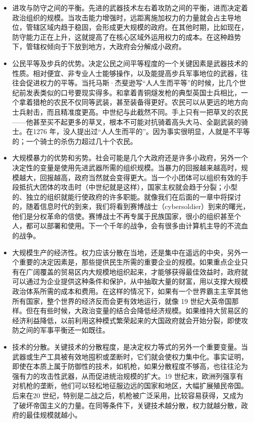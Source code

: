 \begin{itemize}
    \item 进攻与防守之间的平衡。先进的武器技术左右着攻防之间的平衡，进而决定着政治组织的规模。当攻击能力增强时，远距离施加权力的力量就会占主导地位，管辖区域内趋于稳固，会形成更大规模的政府。在其他时期，比如现在，防守能力正在上升，这就提高了在核心区域外运用权力的成本。在这种趋势下，管辖权倾向于下放到地方，大政府会分解成小政府。
    \item 公民平等及步兵的优势。决定公民之间平等程度的一个关键因素是武器技术的性质。相对便宜、非专业人士能够操作，以及能提高步兵军事地位的武器，往往会促进权力的平等。当托马斯·杰斐逊写“人人生而平等”的时候，比几个世纪前发表类似的口号要现实得多。和拿着青铜燧发枪的典型英国士兵相比，一个拿着猎枪的农民不仅同等武装，甚至装备得更好。农民可以从更远的地方向士兵射击，而且精准度更高。中世纪与此截然不同。手上只有一把草叉的农民——他甚至买不起更多的草叉，根本不可能对抗骑着高头大马、全副武装的骑士。在1276 年，没人提出过“人人生而平的”。因为事实很明显，人就是不平等的；一个骑士的杀伤力超过几十个农民。
    \item 大规模暴力的优势和劣势。社会可能是几个大政府还是许多小政府，另外一个决定性的变量是使用先进武器所需的组织规模。当暴力的回报越来越高时，规模越大，回报越高，政府当然就会变得更大。当一个小团体可以组织有效的手段抵抗大团体的攻击时（中世纪就是这样），国家主权就会趋于分裂；小型的、独立的组织就能行使政府的许多职能。就像我们在后面的一章中将探讨的，随着信息时代的到来，我们将看到赛博战士（cybersoldier）到来的曙光，他们是分权革命的信使。赛博战士不再专属于民族国家，很小的组织甚至个人，都可以部署和使用。下一个千年的战争，会有很多由计算机主导的不流血的战争。
    \item 大规模生产的经济性。权力应该分散在当地，还是集中在遥远的中央，另外一个重要的决定因素是，那些提供民生所需的重要企业的规模。如果重点企业只有在广阔覆盖的贸易区内大规模地组织起来，才能够获得最佳效益时，政府就可以通过为企业提供这种条件和保护，从中抽取大量的财富，用以支撑大规模政治体系所需的成本和费用。在这样的情况下，如果有一个世界霸主主宰其他所有国家，整个世界的经济反而会更有效地运行，就像 19 世纪大英帝国那样。但在有些时候，大政治变量的结合会降低经济规模。如果维持大贸易区的经济利益降低，以前利用这种模式繁荣起来的大国政府就会开始分裂，即使攻防之间的军事平衡还一如既往。
    \item 技术的分散。关键技术的分散程度，是决定权力等式的另外一个重要变量。当武器或生产工具被有效地囤积或垄断时，它们就会使权力集中化。事实证明，即使在本质上属于防御性的技术，如机枪，如果分散程度不够高，也往往沦为强有力的攻击性武器，从而促进统治规模的扩大。19 世纪末，欧洲列强享有对机枪的垄断，他们可以轻松地征服边远的国家和地区，大幅扩展殖民帝国。后来在20 世纪，特别是二战之后，机枪被广泛采用，比较容易获得，又成为了破坏帝国主义的力量。在同等条件下，关键技术越分散，权力就越分散，政府的最佳规模就越小。
\end{itemize}

